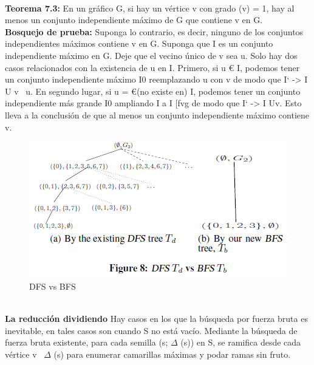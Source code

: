 \\
\textbf{Teorema 7.3:} En un gráfico G, si hay un vértice v con grado (v) = 1, hay al menos un conjunto independiente máximo de G que contiene v en G.
\\
\textbf{Bosquejo de prueba:} Suponga lo contrario, es decir, ninguno de los conjuntos independientes máximos contiene v en G. Suponga que I es un conjunto independiente máximo en G. Deje que el vecino único de v sea u. Solo hay dos casos relacionados con la existencia de u en I. Primero, si u € I, podemos tener un conjunto independiente máximo I0 reemplazando u con v de modo que I` -> I U {v} \ {u}. En segundo lugar, si u = €(no existe en) I, podemos tener un conjunto independiente más grande I0 ampliando I a I [fvg de modo que I` -> I U{v}.
Esto lleva a la conclusión de que al menos un conjunto independiente máximo contiene v.
\\
\begin{figure}[h!]
\centering
\includegraphics[scale=1]{img/imagen15.png}
\caption{DFS vs BFS}
\label{Comandos}
\end{figure}
\\
\textbf{La reducción dividiendo}
Hay casos en los que la búsqueda por fuerza bruta es inevitable, en tales casos son cuando S no está vacío. Mediante la búsqueda de fuerza bruta existente, para cada semilla (s; \begin{math}\Delta\end{math} (s)) en S, se ramifica desde cada vértice v \ \begin{math}\Delta\end{math} (s) para enumerar camarillas máximas y podar ramas sin fruto.
\\
